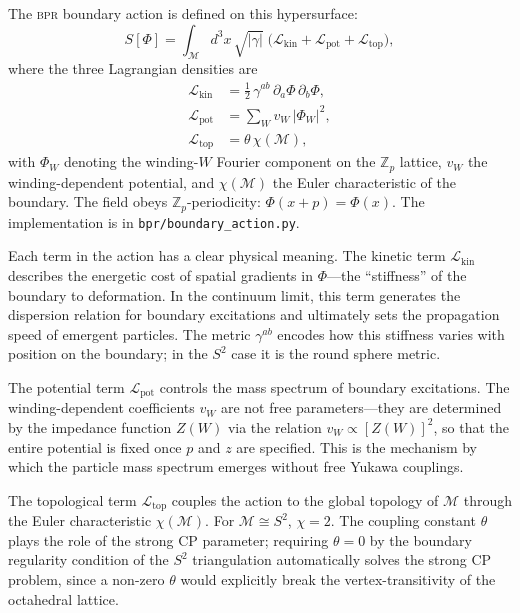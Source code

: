 \documentclass[aps,prd,twocolumn,superscriptaddress,longbibliography,nofootinbib]{revtex4-2}
\newcommand{\Zp}{\mathbb{Z}_p}
\newcommand{\Stwo}{S^2}
\newcommand{\Zimp}{Z}
\newcommand{\bpr}{\textsc{bpr}}
\begin{document}
The \bpr{} boundary action is defined on this hypersurface:
\begin{equation}
S[\Phi] = \int_{\mathcal{M}} \! d^3x \, \sqrt{|\gamma|} \;
\bigl( \mathcal{L}_{\mathrm{kin}} +
       \mathcal{L}_{\mathrm{pot}} +
       \mathcal{L}_{\mathrm{top}} \bigr),
\label{eq:master_action}
\end{equation}
where the three Lagrangian densities are
\begin{align}
\mathcal{L}_{\mathrm{kin}} &=
  \tfrac{1}{2}\, \gamma^{ab}\, \partial_a \Phi\, \partial_b \Phi,
  \label{eq:Lkin} \\
\mathcal{L}_{\mathrm{pot}} &=
  \sum_{W} v_W \, |\Phi_W|^2,
  \label{eq:Lpot} \\
\mathcal{L}_{\mathrm{top}} &=
  \theta\, \chi(\mathcal{M}),
  \label{eq:Ltop}
\end{align}
with $\Phi_W$ denoting the winding-$W$ Fourier component on the
$\Zp$ lattice, $v_W$ the winding-dependent potential, and
$\chi(\mathcal{M})$ the Euler characteristic of the boundary.  The
field obeys $\Zp$-periodicity: $\Phi(x + p) = \Phi(x)$.  The
implementation is in \texttt{bpr/boundary\_action.py}.

Each term in the action has a clear physical meaning.  The kinetic
term $\mathcal{L}_{\mathrm{kin}}$ describes the energetic cost of
spatial gradients in $\Phi$---the ``stiffness'' of the boundary to
deformation.  In the continuum limit, this term generates the
dispersion relation for boundary excitations and ultimately sets the
propagation speed of emergent particles.  The metric
$\gamma^{ab}$ encodes how this stiffness varies with position on the
boundary; in the $\Stwo$ case it is the round sphere metric.

The potential term $\mathcal{L}_{\mathrm{pot}}$ controls the mass
spectrum of boundary excitations.  The winding-dependent
coefficients $v_W$ are not free parameters---they are determined
by the impedance function $\Zimp(W)$ via the relation
$v_W \propto [\Zimp(W)]^2$, so that the entire potential is fixed
once $p$ and $z$ are specified.  This is the mechanism by which the
particle mass spectrum emerges without free Yukawa couplings.

The topological term $\mathcal{L}_{\mathrm{top}}$ couples the action
to the global topology of $\mathcal{M}$ through the Euler
characteristic $\chi(\mathcal{M})$.  For $\mathcal{M} \cong \Stwo$,
$\chi = 2$.  The coupling constant $\theta$ plays the role of the
strong CP parameter; requiring $\theta = 0$ by the boundary
regularity condition of the $\Stwo$ triangulation automatically
solves the strong CP problem, since a non-zero $\theta$ would
explicitly break the vertex-transitivity of the octahedral lattice.
\end{document}
